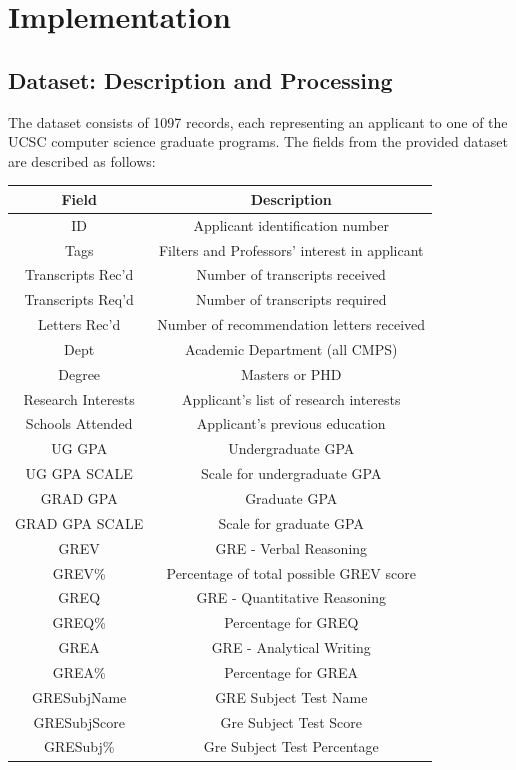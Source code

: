 \documentclass[]{article}
\begin{document}
\section{Implementation}
	\subsection{Dataset: Description and Processing}
		The dataset consists of 1097 records, each representing an applicant to one of the UCSC computer science graduate programs. The fields from the provided dataset are described as follows:
		
		\begin{tabular}{c|c}
		 Field & Description \\ \hline
		 ID & Applicant identification number \\
		 Tags & Filters and Professors' interest in applicant\\
		 Transcripts Rec'd & Number of transcripts received \\ 
		 Transcripts Req'd & Number of transcripts required \\
		 Letters Rec'd & Number of recommendation letters received\\
		 Dept & Academic Department (all CMPS)\\
		 Degree & Masters or PHD\\
		 Research Interests & Applicant's list of research interests\\
		 Schools Attended & Applicant's previous education\\
		 UG GPA & Undergraduate GPA\\
		 UG GPA SCALE & Scale for undergraduate GPA\\ 		 
		 GRAD GPA & Graduate GPA\\
		 GRAD GPA SCALE & Scale for graduate GPA\\
		 GREV & GRE - Verbal Reasoning\\
		 GREV\% & Percentage of total possible GREV score\\
		 GREQ & GRE - Quantitative Reasoning\\
		 GREQ\% & Percentage for GREQ\\
		 GREA & GRE - Analytical Writing\\
		 GREA\% & Percentage for GREA\\
		 GRESubjName & GRE Subject Test Name \\ 
		 GRESubjScore & Gre Subject Test Score\\
		 GRESubj\% & Gre Subject Test Percentage\\

\end{tabular}
\end{document}
